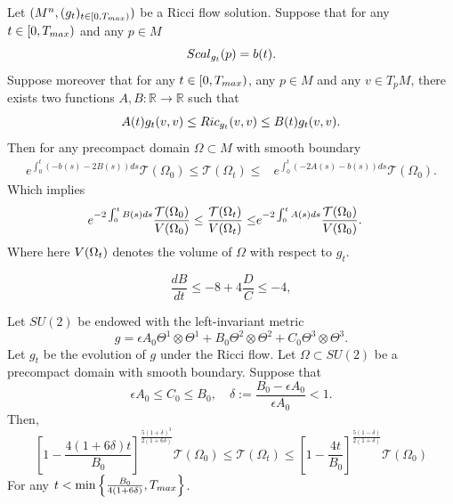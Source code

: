 \documentclass[10pt,a4paper]{amsart}
\newcommand{\V}{{\rm V}}
\begin{document}
\begin{lettertheorem} \label{Thm:Ric}Let $(M^n,(g_t)_{t\in [0,T_{\rm max})})$ be a Ricci flow solution. Suppose that for any $t\in [0,T_{\rm max})$ and any $p\in M$
$$
 {\rm Scal}_{g_t}(p)=b(t).
$$
Suppose moreover that for any $t\in [0,T_{\rm max})$, any $p\in M$ and any $v\in T_pM$, there exists two functions $A,B:\mathbb{R}\to\mathbb{R}$ such that 
$$
A(t)g_t(v,v)\leq {\rm Ric}_{g_t}(v,v)\leq B(t)g_t(v,v). 
$$
Then for any precompact domain $\Omega\subset M$ with smooth boundary 
$$
\begin{aligned}
 e^{\int_0^t\left(-b(s)-2B(s)\right)ds}\mathcal{T}(\Omega_0)\leq\mathcal{T}(\Omega_t)\leq& e^{\int_0^t\left(-2A(s)-b(s)\right)ds}\mathcal{T}(\Omega_0). 
\end{aligned}
$$
Which implies
$$
\begin{aligned}
 e^{-2\int_0^tB(s)ds}\frac{\mathcal{T}(\Omega_0)}{\V(\Omega_0)}\leq\frac{\mathcal{T}(\Omega_t)}{\V(\Omega_t)}\leq& e^{-2\int_0^tA(s)ds}\frac{\mathcal{T}(\Omega_0)}{\V(\Omega_0)}. 
\end{aligned}
$$
Where here  ${\rm V}(\Omega_t)$ denotes the volume of $\Omega$ with respect to $g_t$.
\end{lettertheorem}

 \begin{equation}\label{ode:1}
\frac{d B}{dt}\leq -8+4\frac{D}{C}\leq -4,     
 \end{equation}

 \begin{theorem}
    Let $SU(2)$ be endowed with the left-invariant metric 
    $$
g=\epsilon A_0 \Theta^1\otimes\Theta^1+B_0 \Theta^2\otimes\Theta^2+C_0\Theta^3\otimes\Theta^3.
$$
Let $g_t$ be the evolution of $g$ under the Ricci flow. Let $\Omega\subset SU(2)$ be a precompact domain with smooth boundary. Suppose that 
$$
\epsilon A_0\leq C_0\leq B_0,\quad \delta:=\frac{B_0-\epsilon A_0}{\epsilon A_0}<1.
$$
Then,
$$
\left[1-\frac{4(1+6\delta)t}{B_0}\right]^{\frac{5(1+\delta)^3}{2(1+6\delta)}}\mathcal{T}(\Omega_0)\leq \mathcal{T}(\Omega_t)\leq \left[1-\frac{4t}{B_0}\right]^{\frac{5(1-\delta)}{2(1+\delta)}}\mathcal{T}(\Omega_0)
$$
For any $t<\min\left\{\frac{B_0}{4(1+6\delta)},T_{\rm max}\right\}$.
\end{theorem}
\end{document}
